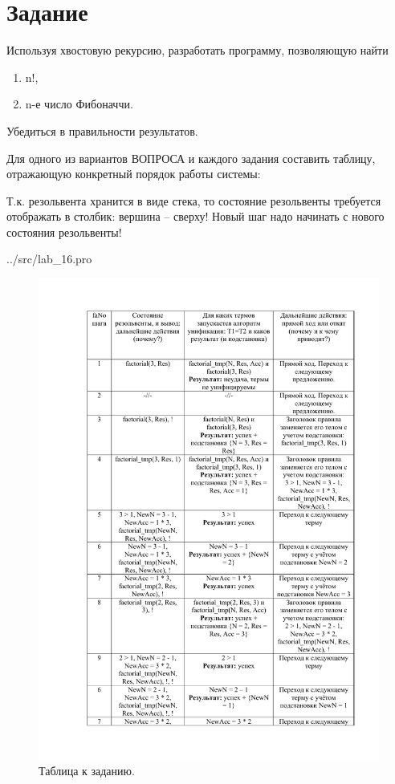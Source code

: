 \section*{Задание}

Используя хвостовую рекурсию, разработать программу, позволяющую найти
\begin{enumerate}
	\item n!,
	\item n-е число Фибоначчи.
\end{enumerate}

Убедиться в правильности результатов.

Для одного из вариантов ВОПРОСА и каждого задания составить таблицу,
отражающую конкретный порядок работы системы:

Т.к. резольвента хранится в виде стека, то состояние резольвенты требуется отображать
в столбик: вершина – сверху! Новый шаг надо начинать с нового состояния резольвенты!
\begin{lstinputlisting}[label=third,caption=Решение задания №1, language=prolog, firstline=1, lastline=22]{../src/lab_16.pro}
\end{lstinputlisting}
\begin{figure}[H]
	\caption{Таблица к заданию.}
	\begin{center}
		\includegraphics[scale=0.85]{img/16.1.pdf}
	\end{center}
	
\end{figure}

